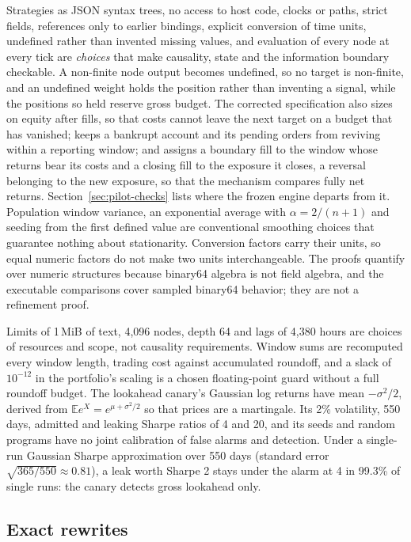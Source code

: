 \documentclass[11pt]{article}
\newcommand{\E}{\mathbb{E}}
\begin{document}
Strategies as JSON syntax trees, no access to host code, clocks or paths, strict fields, references only to earlier bindings, explicit conversion of time units, undefined rather than invented missing values, and evaluation of every node at every tick are \emph{choices} that make causality, state and the information boundary checkable. A non-finite node output becomes undefined, so no target is non-finite, and an undefined weight holds the position rather than inventing a signal, while the positions so held reserve gross budget. The corrected specification also sizes on equity after fills, so that costs cannot leave the next target on a budget that has vanished; keeps a bankrupt account and its pending orders from reviving within a reporting window; and assigns a boundary fill to the window whose returns bear its costs and a closing fill to the exposure it closes, a reversal belonging to the new exposure, so that the mechanism compares fully net returns. Section~\ref{sec:pilot-checks} lists where the frozen engine departs from it. Population window variance, an exponential average with $\alpha=2/(n+1)$ and seeding from the first defined value are conventional smoothing choices that guarantee nothing about stationarity. Conversion factors carry their units, so equal numeric factors do not make two units interchangeable. The proofs quantify over numeric structures because binary64 algebra is not field algebra, and the executable comparisons cover sampled binary64 behavior; they are not a refinement proof.

Limits of 1\,MiB of text, 4{,}096 nodes, depth 64 and lags of 4{,}380 hours are choices of resources and scope, not causality requirements. Window sums are recomputed every window length, trading cost against accumulated roundoff, and a slack of $10^{-12}$ in the portfolio's scaling is a chosen floating-point guard without a full roundoff budget. The lookahead canary's Gaussian log returns have mean $-\sigma^2/2$, derived from $\E e^X=e^{\mu+\sigma^2/2}$ so that prices are a martingale. Its 2\% volatility, 550 days, admitted and leaking Sharpe ratios of 4 and 20, and its seeds and random programs have no joint calibration of false alarms and detection. Under a single-run Gaussian Sharpe approximation over 550 days (standard error $\sqrt{365/550}\approx0.81$), a leak worth Sharpe 2 stays under the alarm at 4 in 99.3\% of single runs: the canary detects gross lookahead only.

\subsection{Exact rewrites}\label{app:rewrites}
\end{document}
